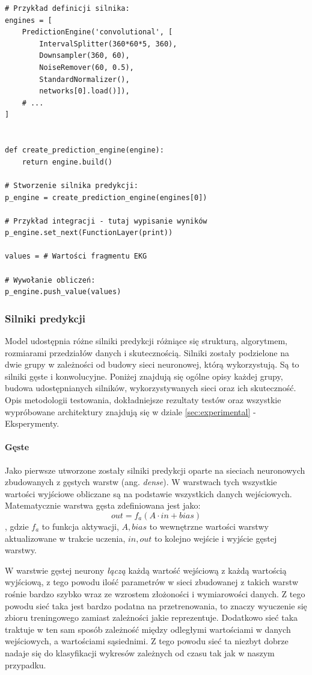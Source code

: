 \documentclass[polish,12pt]{aghthesis}
\begin{document}
\begin{lstlisting}[float=h, style=custompy, caption=Interfejsu modelu i przykład wykorzystania]
# Przykład definicji silnika:
engines = [
    PredictionEngine('convolutional', [
        IntervalSplitter(360*60*5, 360),
        Downsampler(360, 60),
        NoiseRemover(60, 0.5),
        StandardNormalizer(),
        networks[0].load()]),
    # ...
]


def create_prediction_engine(engine):
    return engine.build()

# Stworzenie silnika predykcji:
p_engine = create_prediction_engine(engines[0])

# Przykład integracji - tutaj wypisanie wyników
p_engine.set_next(FunctionLayer(print))

values = # Wartości fragmentu EKG

# Wywołanie obliczeń:
p_engine.push_value(values)
\end{lstlisting}

\subsubsection{Silniki predykcji}

Model udostępnia różne silniki predykcji różniące się strukturą, algorytmem, rozmiarami przedziałów danych i skutecznością. Silniki zostały podzielone na dwie grupy w zależności od budowy sieci neuronowej, którą wykorzystują. Są to silniki gęste i konwolucyjne. Poniżej znajdują się ogólne opisy każdej grupy, budowa udostępnianych silników, wykorzystywanych sieci oraz ich skuteczność. Opis metodologii testowania, dokładniejsze rezultaty testów oraz wszystkie wypróbowane architektury znajdują się w dziale \ref{sec:experimental} - Eksperymenty.

\paragraph{Gęste}

Jako pierwsze utworzone zostały silniki predykcji oparte na sieciach neuronowych zbudowanych z gęstych warstw (ang. \emph{dense}). W warstwach tych wszystkie wartości wyjściowe obliczane są na podstawie wszystkich danych wejściowych. Matematycznie warstwa gęsta zdefiniowana jest jako:
$$
out = f_a(A \cdot in + bias)
$$
, gdzie $f_a$ to funkcja aktywacji, $A, bias$ to wewnętrzne wartości warstwy aktualizowane w trakcie uczenia, $in, out$ to kolejno wejście i wyjście gęstej warstwy. 

W warstwie gęstej neurony \emph{łączą} każdą wartość wejściową z każdą wartością wyjściową, z tego powodu ilość parametrów w sieci zbudowanej z takich warstw rośnie bardzo szybko wraz ze wzrostem złożoności i wymiarowości danych. Z tego powodu sieć taka jest bardzo podatna na przetrenowania, to znaczy wyuczenie się zbioru treningowego zamiast zależności jakie reprezentuje. Dodatkowo sieć taka traktuje w ten sam sposób zależność między odległymi wartościami w danych wejściowych, a wartościami sąsiednimi. Z tego powodu sieć ta niezbyt dobrze nadaje się do klasyfikacji wykresów zależnych od czasu tak jak w naszym przypadku.
\end{document}

